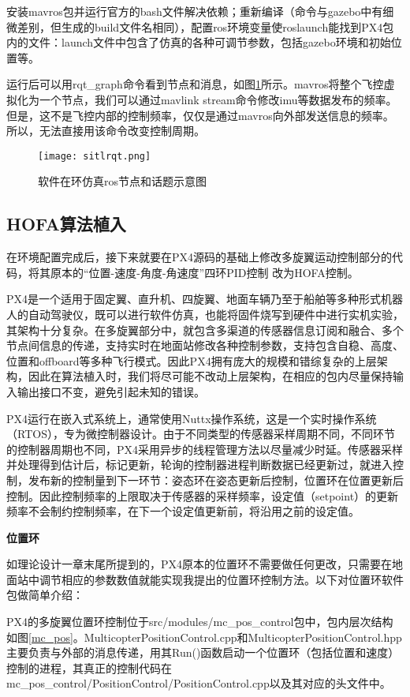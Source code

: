 安装mavros包并运行官方的bash文件解决依赖；重新编译（命令与gazebo中有细微差别，但生成的build文件名相同），配置ros环境变量使roslaunch能找到PX4包内的文件：launch文件中包含了仿真的各种可调节参数，包括gazebo环境和初始位置等。

运行后可以用rqt\_graph命令看到节点和消息，如图\ref{sitlrqt}所示。mavros将整个飞控虚拟化为一个节点，我们可以通过mavlink stream命令修改imu等数据发布的频率。但是，这不是飞控内部的控制频率，仅仅是通过mavros向外部发送信息的频率。所以，无法直接用该命令改变控制周期。
\begin{figure}[!h]
  \centering
  \texttt{[image: sitlrqt.png]}
  \caption{软件在环仿真ros节点和话题示意图}
  \label{sitlrqt}
\end{figure}

 \subsection{HOFA算法植入}
在环境配置完成后，接下来就要在PX4源码的基础上修改多旋翼运动控制部分的代码，将其原本的“位置-速度-角度-角速度”四环PID控制 \cite{px4控制}改为HOFA控制。

PX4是一个适用于固定翼、直升机、四旋翼、地面车辆乃至于船舶等多种形式机器人的自动驾驶仪，既可以进行软件仿真，也能将固件烧写到硬件中进行实机实验，其架构十分复杂。在多旋翼部分中，就包含多渠道的传感器信息订阅和融合、多个节点间信息的传递，支持实时在地面站修改各种控制参数，支持包含自稳、高度、位置和offboard等多种飞行模式。因此PX4拥有庞大的规模和错综复杂的上层架构，因此在算法植入时，我们将尽可能不改动上层架构，在相应的包内尽量保持输入输出接口不变，避免引起未知的错误。

PX4运行在嵌入式系统上，通常使用Nuttx操作系统，这是一个实时操作系统（RTOS），专为微控制器设计。由于不同类型的传感器采样周期不同，不同环节的控制器周期也不同，PX4采用异步的线程管理方法以尽量减少时延。传感器采样并处理得到估计后，标记更新，轮询的控制器进程判断数据已经更新过，就进入控制，发布新的控制量到下一环节：姿态环在姿态更新后控制，位置环在位置更新后控制。因此控制频率的上限取决于传感器的采样频率，设定值（setpoint）的更新频率不会制约控制频率，在下一个设定值更新前，将沿用之前的设定值。

\textbf{位置环}

如理论设计一章末尾所提到的，PX4原本的位置环不需要做任何更改，只需要在地面站中调节相应的参数数值就能实现我提出的位置环控制方法。以下对位置环软件包做简单介绍：

PX4的多旋翼位置环控制位于src/modules/mc\_pos\_control包中，包内层次结构如图\ref{mc_pos}。MulticopterPositionControl.cpp和MulticopterPositionControl.hpp主要负责与外部的消息传递，用其Run()函数启动一个位置环（包括位置和速度）控制的进程，其真正的控制代码在mc\_pos\_control/PositionControl/PositionControl.cpp以及其对应的头文件中。

